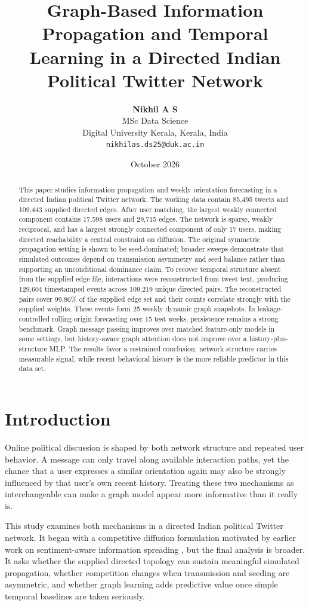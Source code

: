 \documentclass[11pt,a4paper]{article}
\title{\textbf{Graph-Based Information Propagation and Temporal Learning in a Directed Indian Political Twitter Network}}
\author{\textbf{Nikhil A S}\\MSc Data Science\\Digital University Kerala, Kerala, India\\\texttt{nikhilas.ds25@duk.ac.in}}
\date{October 2026}
\begin{document}
\maketitle

\begin{abstract}
This paper studies information propagation and weekly orientation forecasting in a directed Indian political Twitter network. The working data contain 85,495 tweets and 109,443 supplied directed edges. After user matching, the largest weakly connected component contains 17,598 users and 29,715 edges. The network is sparse, weakly reciprocal, and has a largest strongly connected component of only 17 users, making directed reachability a central constraint on diffusion. The original symmetric propagation setting is shown to be seed-dominated; broader sweeps demonstrate that simulated outcomes depend on transmission asymmetry and seed balance rather than supporting an unconditional dominance claim. To recover temporal structure absent from the supplied edge file, interactions were reconstructed from tweet text, producing 129,604 timestamped events across 109,219 unique directed pairs. The reconstructed pairs cover 99.86\% of the supplied edge set and their counts correlate strongly with the supplied weights. These events form 25 weekly dynamic graph snapshots. In leakage-controlled rolling-origin forecasting over 15 test weeks, persistence remains a strong benchmark. Graph message passing improves over matched feature-only models in some settings, but history-aware graph attention does not improve over a history-plus-structure MLP. The results favor a restrained conclusion: network structure carries measurable signal, while recent behavioral history is the more reliable predictor in this data set.
\end{abstract}

\section{Introduction}
Online political discussion is shaped by both network structure and repeated user behavior. A message can only travel along available interaction paths, yet the chance that a user expresses a similar orientation again may also be strongly influenced by that user's own recent history. Treating these two mechanisms as interchangeable can make a graph model appear more informative than it really is.

This study examines both mechanisms in a directed Indian political Twitter network. It began with a competitive diffusion formulation motivated by earlier work on sentiment-aware information spreading \citep{sharma2026}, but the final analysis is broader. It asks whether the supplied directed topology can sustain meaningful simulated propagation, whether competition changes when transmission and seeding are asymmetric, and whether graph learning adds predictive value once simple temporal baselines are taken seriously.
\end{document}
